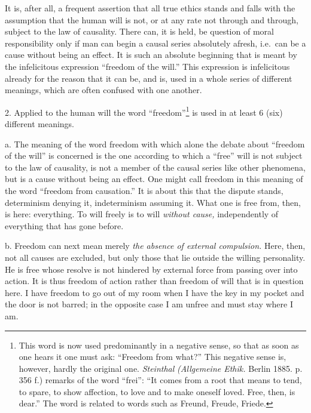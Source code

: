 \documentclass[12pt,a4paper,openany]{book}
\newcommand{\opage}[1]{\marginnote{\footnotesize\textit{[#1]}}}
\begin{document}
It is, after all, a frequent assertion that all true ethics stands and falls with the assumption that
the human will is not, or at any rate not through and through, subject to the law of causality. There
can, it is held, be question of moral responsibility only if man can begin a causal series absolutely
afresh, i.e.\ can be a cause without being an effect. It is such an absolute beginning that is meant
by the infelicitous expression ``freedom of the will.'' This expression is infelicitous already for the
reason that it can be, and is, used in a whole series of different meanings, which are often confused
with one another.

2. Applied to the human will the word ``freedom''\footnote[1]{This word is now used predominantly in a
negative sense, so that as soon as one hears it one must ask: ``Freedom from what?'' This negative
sense is, however, hardly the original one. \emph{Steinthal} \textit{(Allgemeine Ethik.} Berlin 1885. p.
356 f.) remarks of the word ``frei'': ``It comes from a root that means to tend, to spare, to show
affection, to love and to make oneself loved. Free, then, is dear.'' The word is related to words such
as Freund, Freude, Friede.} is used in at least 6 (six) different meanings.

a. The meaning of the word freedom with which alone the debate about ``freedom of the will'' is
concerned is the one according to which a ``free'' will is not subject to the law of causality, is not
a member of the causal series like other phenomena, but is a cause without being an effect. One might
call freedom in this meaning of the word ``freedom from causation.'' It is about this that the dispute
stands, determinism denying it, indeterminism assuming it. What
\opage{108}one is free from, then, is here: everything. To will freely is to will \textit{without cause,}
independently of everything that has gone before.

b. Freedom can next mean merely \textit{the absence of external compulsion.} Here, then, not all causes
are excluded, but only those that lie outside the willing personality. He is free whose resolve is not
hindered by external force from passing over into action. It is thus freedom of action rather than
freedom of will that is in question here. I have freedom to go out of my room when I have the key in my
pocket and the door is not barred; in the opposite case I am unfree and must stay where I am.
\end{document}
